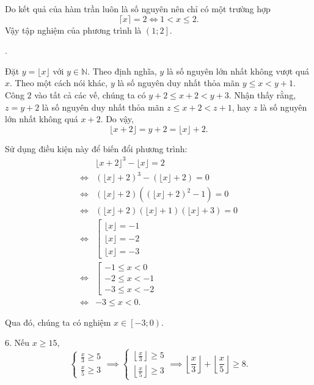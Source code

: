 Do kết quả của hàm trần luôn là số nguyên nên chỉ có một trường hợp
\begin{equation*}
   \lceil x \rceil = 2 \iff 1 < x \leq 2.
\end{equation*}
Vậy tập nghiệm của phương trình là $\left(1; 2\right]$.

.

Đặt $y = \lfloor x \rfloor$ với $y \in \mathbb{N}$. Theo định nghĩa, $y$ là số nguyên lớn nhất không vượt quá $x$. Theo một cách nói khác, $y$ là số nguyên duy nhất thỏa mãn $y \leq x < y + 1$. Công $2$ vào tất cả các vế, chúng ta có $y + 2 \leq x + 2 < y + 3$. Nhận thấy rằng, $z = y + 2$ là số nguyên duy nhất thỏa mãn $z \leq x + 2 < z + 1$, hay $z$ là số nguyên lớn nhất không quá $x + 2$. Do vậy, 
\begin{equation}
   \lfloor x + 2 \rfloor = y + 2 = \lfloor x \rfloor + 2.
\end{equation}

Sử dụng điều kiện này để biến đổi phương trình:
\begin{align*}
   &\lfloor x + 2 \rfloor^3 - \lfloor x \rfloor = 2\\
   \iff &\left(\lfloor x \rfloor + 2\right)^3 - \left(\lfloor x \rfloor + 2\right) = 0 \\
   \iff &\left(\lfloor x \rfloor + 2\right)\left(\left(\lfloor x \rfloor + 2\right)^2 - 1\right) = 0 \\
   \iff &\left(\lfloor x \rfloor + 2\right)\left(\lfloor x \rfloor + 1\right)\left(\lfloor x \rfloor + 3\right) = 0 \\
   \iff &\left[\begin{array}{l}
      \lfloor x \rfloor = -1 \\
      \lfloor x \rfloor = -2 \\
      \lfloor x \rfloor = -3
   \end{array}\right. \\
   \iff &\left[\begin{array}{l}
      -1 \leq x < 0 \\
      -2 \leq x < -1 \\
      -3 \leq x < -2
   \end{array}\right. \\
   \iff & -3 \leq x < 0.
\end{align*}

Qua đó, chúng ta có nghiệm $x \in \left[-3; 0\right)$.

6. Nếu $x \geq 15$, $$\begin{cases}
   \frac{x}{3} \geq 5 \\
   \frac{x}{5} \geq 3
\end{cases} \implies \begin{cases}
   \left\lfloor \frac{x}{3} \right\rfloor \geq 5 \\
   \left\lfloor \frac{x}{5} \right\rfloor \geq 3
\end{cases} \implies \left\lfloor \frac{x}{3} \right\rfloor + \left\lfloor \frac{x}{5} \right\rfloor \geq 8.$$

